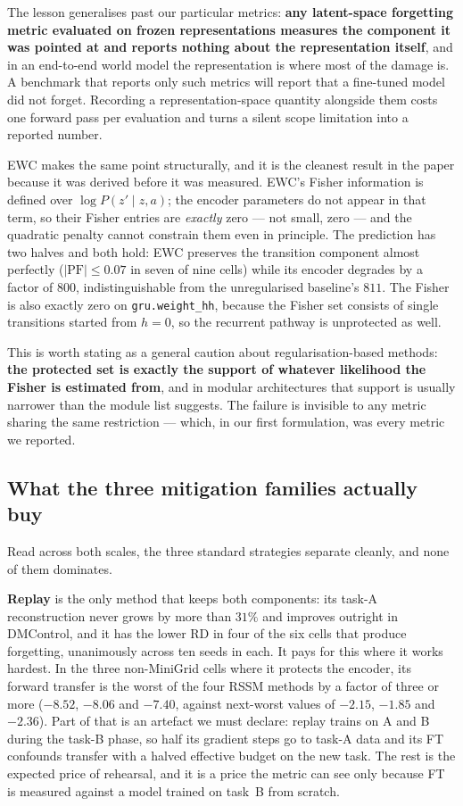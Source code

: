 The lesson generalises past our particular metrics: \textbf{any latent-space
forgetting metric evaluated on frozen representations measures the component it
was pointed at and reports nothing about the representation itself}, and in an
end-to-end world model the representation is where most of the damage is. A
benchmark that reports only such metrics will report that a fine-tuned model did
not forget. Recording a representation-space quantity alongside them costs one
forward pass per evaluation and turns a silent scope limitation into a reported
number.

EWC makes the same point structurally, and it is the cleanest result in the
paper because it was derived before it was measured. EWC's Fisher information is
defined over $\log P(z' \mid z, a)$; the encoder parameters do not appear in that
term, so their Fisher entries are \emph{exactly} zero --- not small, zero --- and
the quadratic penalty cannot constrain them even in principle. The prediction has
two halves and both hold: EWC preserves the transition component almost perfectly
($|\text{PF}| \le 0.07$ in seven of nine cells) while its encoder degrades by a
factor of $800$, indistinguishable from the unregularised baseline's $811$. The Fisher is
also exactly zero on \texttt{gru.weight\_hh}, because the Fisher set consists of
single transitions started from $h = 0$, so the recurrent pathway is unprotected
as well.

This is worth stating as a general caution about regularisation-based methods:
\textbf{the protected set is exactly the support of whatever likelihood the
Fisher is estimated from}, and in modular architectures that support is usually
narrower than the module list suggests. The failure is invisible to any metric
sharing the same restriction --- which, in our first formulation, was every
metric we reported.

\subsection{What the three mitigation families actually buy}
\label{sec:discussion:methods}

Read across both scales, the three standard strategies separate cleanly, and none
of them dominates.

\textbf{Replay} is the only method that keeps both components: its task-A
reconstruction never grows by more than $31\%$ and improves outright in
DMControl, and it has the lower RD in four of the six cells that produce
forgetting, unanimously across ten seeds in each. It pays for this where it
works hardest. In the three non-MiniGrid cells where it protects the encoder,
its forward transfer is the worst of the four RSSM methods by a factor of three
or more ($-8.52$, $-8.06$ and $-7.40$, against next-worst values of $-2.15$,
$-1.85$ and $-2.36$). Part
of that is an artefact we must declare: replay trains on A and B during the
task-B phase, so half its gradient steps go to task-A data and its FT confounds
transfer with a halved effective budget on the new task. The rest is the
expected price of rehearsal, and it is a price the metric can see only because FT
is measured against a model trained on task~B from scratch.

